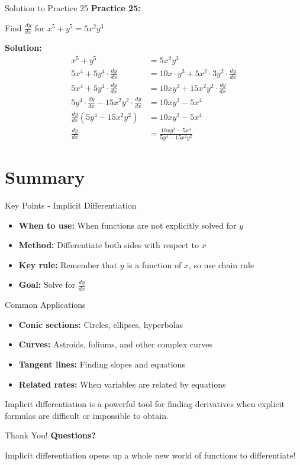 \documentclass[aspectratio=169]{beamer}
\begin{document}
\begin{frame}{Solution to Practice 25}
\textbf{Practice 25:}

Find $\frac{dy}{dx}$ for $x^5 + y^5 = 5x^2y^3$

\textbf{Solution:}
\[
\begin{aligned}
  x^5 + y^5 &= 5x^2y^3 \\
  5x^4 + 5y^4 \cdot \frac{dy}{dx} &= 10x \cdot y^3 + 5x^2 \cdot 3y^2 \cdot \frac{dy}{dx} \\
  5x^4 + 5y^4 \cdot \frac{dy}{dx} &= 10xy^3 + 15x^2y^2 \cdot \frac{dy}{dx} \\
  5y^4 \cdot \frac{dy}{dx} - 15x^2y^2 \cdot \frac{dy}{dx} &= 10xy^3 - 5x^4 \\
  \frac{dy}{dx}(5y^4 - 15x^2y^2) &= 10xy^3 - 5x^4 \\
  \frac{dy}{dx} &= \frac{10xy^3 - 5x^4}{5y^4 - 15x^2y^2}
\end{aligned}
\]
\end{frame}

\section{Summary}

\begin{frame}{Key Points - Implicit Differentiation}
\begin{itemize}
    \item \textbf{When to use:} When functions are not explicitly solved for $y$
    \item \textbf{Method:} Differentiate both sides with respect to $x$
    \item \textbf{Key rule:} Remember that $y$ is a function of $x$, so use chain rule
    \item \textbf{Goal:} Solve for $\frac{dy}{dx}$
\end{itemize}
\end{frame}

\begin{frame}{Common Applications}
\begin{itemize}
    \item \textbf{Conic sections:} Circles, ellipses, hyperbolas
    \item \textbf{Curves:} Astroids, foliums, and other complex curves
    \item \textbf{Tangent lines:} Finding slopes and equations
    \item \textbf{Related rates:} When variables are related by equations
\end{itemize}

\vspace{0.5cm}
Implicit differentiation is a powerful tool for finding derivatives when explicit formulas are difficult or impossible to obtain.
\end{frame}

\begin{frame}{Thank You!}
\centering
\vspace{2cm}
{\Huge \textcolor{myblue}{\textbf{Questions?}}}

\vspace{1cm}
{\Large Implicit differentiation opens up a whole new world of functions to differentiate!}
\end{frame}
\end{document}
